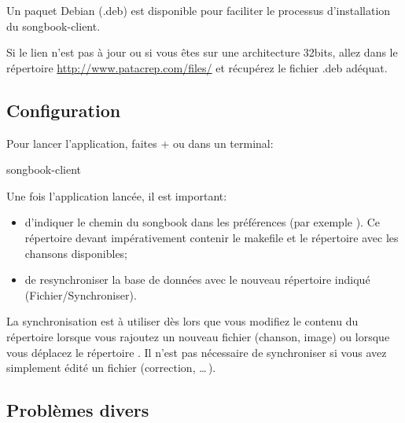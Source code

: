 \documentclass[versionenligne]{patacrep}
\newcommand{\Touche}[1]{\Ovalbox{#1}}
\begin{document}
Un paquet Debian (.deb) est disponible pour faciliter le processus
d'installation du songbook-client. 


\begin{nota}
  Si le lien n'est pas à jour ou si vous êtes sur une architecture
  32bits, allez dans le répertoire
  \url{http://www.patacrep.com/files/} et récupérez le fichier .deb
  adéquat.
\end{nota}

\subsection{Configuration}

Pour lancer l'application,
faites \Touche{Alt}+\Touche{F2}  ou dans un
terminal:
\begin{unixcom}
  songbook-client
\end{unixcom}

Une fois l'application lancée, il est important:
\begin{itemize}
\item d'indiquer le chemin du songbook dans les préférences (par
  exemple ). Ce répertoire devant impérativement
  contenir le makefile et le répertoire  avec les chansons
  disponibles;
\item de resynchroniser la base de données avec le nouveau répertoire
  indiqué (Fichier/Synchroniser).
\end{itemize}

\begin{nota}
  La synchronisation est à utiliser dès lors que vous modifiez le
  contenu du répertoire  lorsque vous rajoutez un nouveau
  fichier (chanson, image) ou lorsque vous déplacez le répertoire
  .  Il n'est pas nécessaire de synchroniser si vous
  avez simplement édité un fichier (correction, \dots\,).
\end{nota}

\subsection{Problèmes divers}
\end{document}

